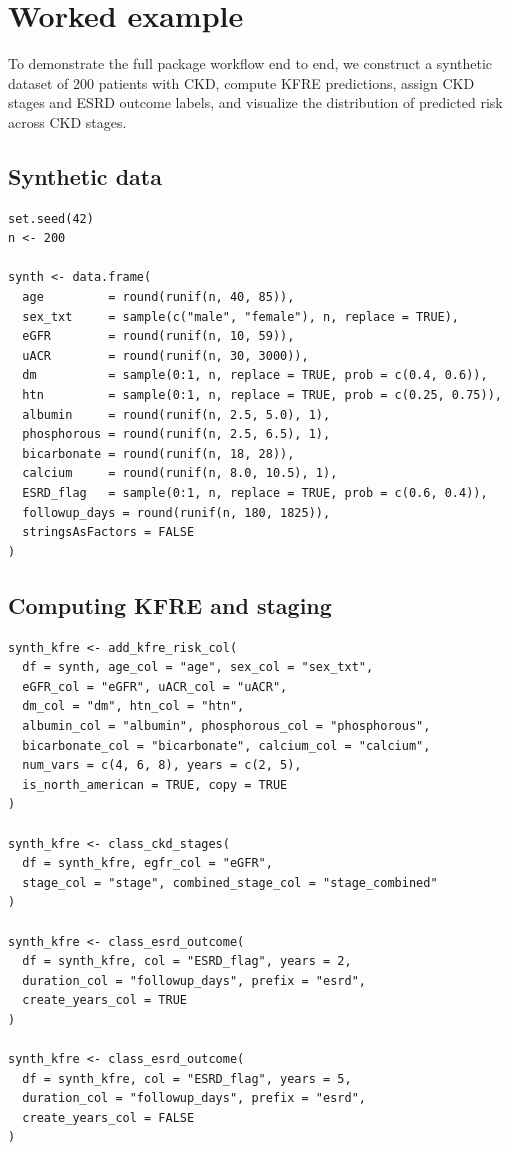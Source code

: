 \section{Worked example}\label{worked-example}

To demonstrate the full package workflow end to end, we construct a synthetic
dataset of 200 patients with CKD, compute KFRE predictions, assign CKD stages
and ESRD outcome labels, and visualize the distribution of predicted risk
across CKD stages.

\subsection{Synthetic data}\label{synthetic-data}

\begin{verbatim}
set.seed(42)
n <- 200

synth <- data.frame(
  age         = round(runif(n, 40, 85)),
  sex_txt     = sample(c("male", "female"), n, replace = TRUE),
  eGFR        = round(runif(n, 10, 59)),
  uACR        = round(runif(n, 30, 3000)),
  dm          = sample(0:1, n, replace = TRUE, prob = c(0.4, 0.6)),
  htn         = sample(0:1, n, replace = TRUE, prob = c(0.25, 0.75)),
  albumin     = round(runif(n, 2.5, 5.0), 1),
  phosphorous = round(runif(n, 2.5, 6.5), 1),
  bicarbonate = round(runif(n, 18, 28)),
  calcium     = round(runif(n, 8.0, 10.5), 1),
  ESRD_flag   = sample(0:1, n, replace = TRUE, prob = c(0.6, 0.4)),
  followup_days = round(runif(n, 180, 1825)),
  stringsAsFactors = FALSE
)
\end{verbatim}

\subsection{Computing KFRE and staging}\label{computing-kfre-and-staging}

\begin{verbatim}
synth_kfre <- add_kfre_risk_col(
  df = synth, age_col = "age", sex_col = "sex_txt",
  eGFR_col = "eGFR", uACR_col = "uACR",
  dm_col = "dm", htn_col = "htn",
  albumin_col = "albumin", phosphorous_col = "phosphorous",
  bicarbonate_col = "bicarbonate", calcium_col = "calcium",
  num_vars = c(4, 6, 8), years = c(2, 5),
  is_north_american = TRUE, copy = TRUE
)

synth_kfre <- class_ckd_stages(
  df = synth_kfre, egfr_col = "eGFR",
  stage_col = "stage", combined_stage_col = "stage_combined"
)

synth_kfre <- class_esrd_outcome(
  df = synth_kfre, col = "ESRD_flag", years = 2,
  duration_col = "followup_days", prefix = "esrd",
  create_years_col = TRUE
)

synth_kfre <- class_esrd_outcome(
  df = synth_kfre, col = "ESRD_flag", years = 5,
  duration_col = "followup_days", prefix = "esrd",
  create_years_col = FALSE
)
\end{verbatim}

